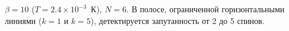 $\beta=10$ ($T = 2.4\times 10^{-3}$~К), $N=6$.
В полосе, ограниченной горизонтальными линиями ($k=1$ и $k=5$),
детектируется запутанность от 2 до 5 спинов.
